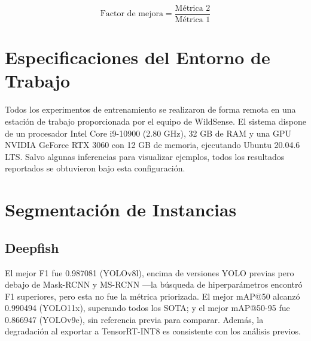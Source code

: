 \begin{equation}
  \text{Factor de mejora} = \dfrac{\text{Métrica 2}}{\text{Métrica 1}}
  \label{eq:improvement_factor}
\end{equation}

\section{Especificaciones del Entorno de Trabajo}
Todos los experimentos de entrenamiento se realizaron de forma remota en una estación de trabajo proporcionada por el equipo de WildSense. El sistema dispone de un procesador Intel Core i9-10900 (2.80 GHz), 32 GB de RAM y una GPU NVIDIA GeForce RTX 3060 con 12 GB de memoria, ejecutando Ubuntu 20.04.6 LTS. Salvo algunas inferencias para visualizar ejemplos, todos los resultados reportados se obtuvieron bajo esta configuración.

\section{Segmentación de Instancias}
\subsection{Deepfish}
El mejor F1 fue 0.987081 (YOLOv8l), encima de versiones YOLO previas pero debajo de Mask-RCNN y MS-RCNN ---la búsqueda de hiperparámetros encontró F1 superiores, pero esta no fue la métrica priorizada. El mejor mAP@50 alcanzó 0.990494 (YOLO11x), superando todos los SOTA; y el mejor mAP@50-95 fue 0.866947 (YOLOv9e), sin referencia previa para comparar. Además, la degradación al exportar a TensorRT-INT8 es consistente con los análisis previos.

